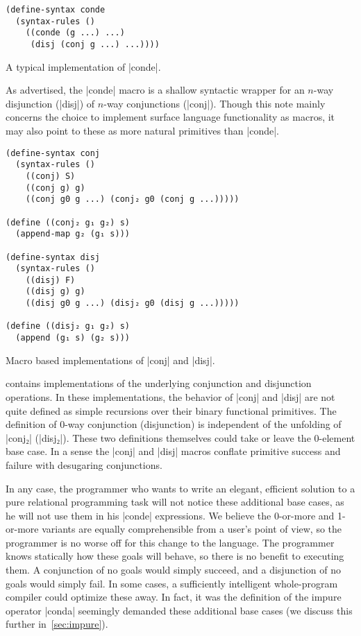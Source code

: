 \documentclass[sigplan,screen,draft,anonymous,review,natbib=false]{acmart}
\begin{document}
\begin{listing}
  \begin{verbatim}
(define-syntax conde
  (syntax-rules ()
    ((conde (g ...) ...)
     (disj (conj g ...) ...))))
  \end{verbatim}
  \caption{A typical implementation of \rackinline|conde|.}
  \label{mnt:conde-implementation}
\end{listing}

As advertised, the \rackinline|conde| macro is a shallow syntactic
wrapper for an $n$-way disjunction (\rackinline|disj|) of $n$-way
conjunctions (\rackinline|conj|). Though this note mainly concerns the
choice to implement surface language functionality as macros, it may
also point to these as more natural primitives than
\rackinline|conde|.

\begin{listing}
  \begin{verbatim}
(define-syntax conj
  (syntax-rules ()
    ((conj) S)
    ((conj g) g)
    ((conj g0 g ...) (conj₂ g0 (conj g ...)))))

(define ((conj₂ g₁ g₂) s)
  (append-map g₂ (g₁ s)))

(define-syntax disj
  (syntax-rules ()
    ((disj) F)
    ((disj g) g)
    ((disj g0 g ...) (disj₂ g0 (disj g ...)))))

(define ((disj₂ g₁ g₂) s)
  (append (g₁ s) (g₂ s)))
  \end{verbatim}
  \caption{Macro based implementations of \rackinline|conj| and \rackinline|disj|.}
  \label{mnt:conj-and-disj-implementation}
\end{listing}

 contains implementations of
the underlying conjunction and disjunction operations. In these
implementations, the behavior of \rackinline|conj| and
\rackinline|disj| are not quite defined as simple recursions over
their binary functional primitives. The definition of 0-way
conjunction (disjunction) is independent of the unfolding of
\rackinline|conj₂| (\rackinline|disj₂|). These two definitions
themselves could take or leave the 0-element base case. In a sense the
\rackinline|conj| and \rackinline|disj| macros conflate primitive
success and failure with desugaring conjunctions.

In any case, the programmer who wants to write an elegant, efficient
solution to a pure relational programming task will not notice these
additional base cases, as he will not use them in his
\rackinline|conde| expressions. We believe the 0-or-more and 1-or-more
variants are equally comprehensible from a user's point of view, so
the programmer is no worse off for this change to the language. The
programmer knows statically how these goals will behave, so there is
no benefit to executing them. A conjunction of no goals would simply
succeed, and a disjunction of no goals would simply fail. In some
cases, a sufficiently intelligent whole-program compiler could
optimize these away. In fact, it was the definition of the impure
operator \rackinline|conda| seemingly demanded these additional base
cases (we discuss this further in~\cref{sec:impure}).
\end{document}
